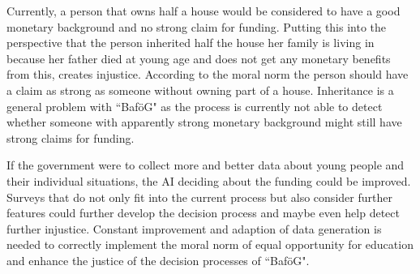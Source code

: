 Currently, a person that owns half a house would be considered to have a good monetary background and no strong claim for funding.
Putting this into the perspective that the person inherited half the house her family is living in because her father died at young age and does not get any monetary benefits from this, creates injustice.
According to the moral norm the person should have a claim as strong as someone without owning part of a house.
Inheritance is a general problem with ``BaföG" as the process is currently not able to detect whether someone with apparently strong monetary background might still have strong claims for funding.

If the government were to collect more and better data about young people and their individual situations, the AI deciding about the funding could be improved.
Surveys that do not only fit into the current process but also consider further features could further develop the decision process and maybe even help detect further injustice.
Constant improvement and adaption of data generation is needed to correctly implement the moral norm of equal opportunity for education and enhance the justice of the decision processes of ``BaföG".